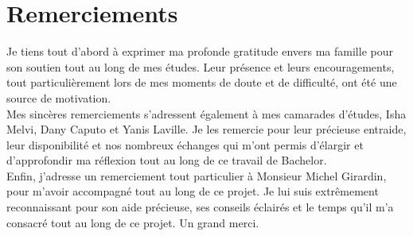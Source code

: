 \chapter*{Remerciements}

Je tiens tout d'abord à exprimer ma profonde gratitude envers ma famille pour son soutien tout au long de mes études. Leur présence et leurs encouragements, tout particulièrement lors de mes moments de doute et de difficulté, ont été une source de motivation.\\

Mes sincères remerciements s'adressent également à mes camarades d'études, Isha Melvi, Dany Caputo et Yanis Laville. Je les remercie pour leur précieuse entraide, leur disponibilité et nos nombreux échanges qui m'ont permis d'élargir et d'approfondir ma réflexion tout au long de ce travail de Bachelor.\\

Enfin, j'adresse un remerciement tout particulier à Monsieur Michel Girardin, pour m'avoir accompagné tout au long de ce projet. Je lui suis extrêmement reconnaissant pour son aide précieuse, ses conseils éclairés et le temps qu'il m'a consacré tout au long de ce projet. Un grand merci.